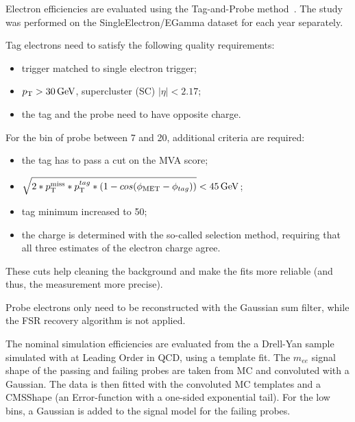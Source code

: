 Electron efficiencies are evaluated using the Tag-and-Probe method~\cite{CMS-EWK-10-005}.
The study was performed on the SingleElectron/EGamma dataset for each year separately.

Tag electrons need to satisfy the following quality requirements:
\begin{itemize}
\item trigger matched to single electron trigger;
\item $p_{\mathrm{T}} > 30 \,\text{Ge\hspace{-.08em}V}$, supercluster (SC) $|\eta| < 2.17$;%
\item the tag and the probe need to have opposite charge.
\end{itemize}

For the bin of probe \pt between 7 and 20\GeV, additional criteria are required:
\begin{itemize}
\item the tag has to pass a cut on the MVA score;
\item $\sqrt{2*p_{\mathrm{T}}^\text{miss}*p_{\mathrm{T}}^{tag}*(1-cos(\phi_{\rm MET}-\phi_{tag}))} < 45 \,\text{Ge\hspace{-.08em}V}$;
\item tag minimum \pt increased to 50\GeV;
\item the charge is determined with the so-called selection method, requiring that all three estimates of the electron charge agree.
\end{itemize}
These cuts help cleaning the background and make the fits more reliable (and thus, the measurement more precise).

Probe electrons only need to be reconstructed with the Gaussian sum filter, while the FSR recovery algorithm is not applied.

The nominal simulation efficiencies are evaluated from the a Drell-Yan sample simulated with \MADGRAPH at Leading Order in QCD,
using a template fit.
The $m_{ee}$ signal shape of the passing and failing probes are taken from MC and convoluted with a Gaussian.
The data is then fitted with the convoluted MC templates and a CMSShape (an Error-function with a one-sided exponential tail).
For the low \pt bins, a Gaussian is added to the signal model for the failing probes.


